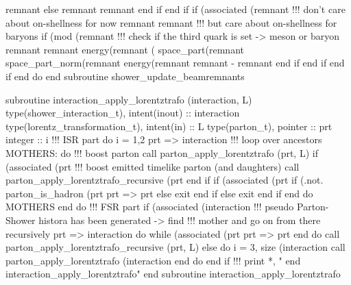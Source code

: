                 remnant%
             else
                remnant%
                remnant%
             end if
          end if
          if (associated (remnant%
             !!! don't care about on-shellness for now
             remnant%
             remnant%
             !!! but care about on-shellness for baryons
             if (mod (remnant%
                !!! check if the third quark is set -> meson or baryon
                remnant%
                remnant%
                     energy(remnant%
                     ( space_part(remnant%
                     space_part_norm(remnant%
                     energy(remnant%
                remnant%
                     - remnant%
             end if
          end if
       end if
    end do
  end subroutine shower_update_beamremnants

\eatline
\nwendcode{}\nwdocspar
\nwenddocs{}\plusendmoddef
  subroutine interaction_apply_lorentztrafo (interaction, L)
    type(shower_interaction_t), intent(inout) :: interaction
    type(lorentz_transformation_t), intent(in) :: L
    type(parton_t), pointer :: prt
    integer :: i
    !!! ISR part
    do i = 1,2
       prt => interaction%
       !!! loop over ancestors
       MOTHERS: do
          !!! boost parton
          call parton_apply_lorentztrafo (prt, L)
          if (associated (prt%
             !!! boost emitted timelike parton (and daughters)
             call parton_apply_lorentztrafo_recursive (prt%
          end if
          if (associated (prt%
             if (.not. parton_is_hadron (prt%
                prt => prt%
             else
                exit
             end if
          else
             exit
          end if
       end do MOTHERS
    end do
    !!! FSR part
    if (associated (interaction%
       !!! pseudo Parton-Shower histora has been generated -> find
       !!!     mother and go on from there recursively
       prt => interaction%
       do while (associated (prt%
          prt => prt%
       end do
       call parton_apply_lorentztrafo_recursive (prt, L)
    else
       do i = 3, size (interaction%
          call parton_apply_lorentztrafo (interaction%
       end do
    end if
    !!! print *, " end interaction_apply_lorentztrafo"
  end subroutine interaction_apply_lorentztrafo

